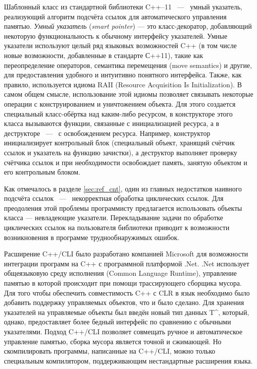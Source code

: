 Шаблонный класс  из стандартной библиотеки C++--11
~---~ умный указатель, реализующий алгоритм подсчёта ссылок для автоматического управления 
памятью. 
\emph{Умный указатель} (\emph{smart pointer}) --- это класс-декоратор, добавляющий некоторую 
функциональность к обычному интерфейсу указателей. Умные указатели используют целый ряд 
языковых возможностей C++ (в том числе новые возможности, добавленные в стандарте С++11), 
такие как переопределение операторов, семантика перемещения (move semantics) и другие, 
для предоставления удобного и интуитивно понятного интерфейса. 
Также, как правило, используется идиома RAII (Resource Acquisition Is Initialization). 
В самом общем смысле, использование этой идиомы позволяет связывать некоторые операции с 
конструированием и уничтожением объекта. 
Для этого создается специальный класс-обёртка над каким-либо ресурсом, в конструкторе этого 
класса вызываются функции, связанные с инициализацией ресурса, а в деструкторе ~---~ с 
освобождением ресурса. 
Например, конструктор  инициализирует контрольный блок (специальный 
объект, хранящий счётчик ссылок и указатель на функцию зачистки), а деструктор выполняет 
проверку счётчика ссылок и при необходимости освобождает память, занятую объектом и его 
контрольным блоком.

Как отмечалось в разделе \ref{sec:ref_cnt}, один из главных недостатков наивного подсчёта 
ссылок ~---~ некорректная обработка циклических ссылок. 
Для преодоления этой проблемы программисту предлагается использовать объекты класса 
 --- невладеющие указатели. 
Перекладывание задачи по обработке циклических ссылок на пользователя библиотеки приводит 
к возможности возникновения в программе труднообнаружимых ошибок.

Расширение C++/CLI было разработано компанией Microsoft для возможности интеграции программ 
на C++ с программной платформой .Net. .Net использует общеязыковую среду исполнения 
(Common Language Runtime), управление памятью в которой происходит при помощи трассирующего 
сборщика мусора. 
Для того чтобы обеспечить совместимость C++ с CLR в язык необходимо было добавить поддержку 
управляемых объектов, что и было сделано. 
Для хранения указателей на управляемые объекты был введён новый тип данных 
T\textasciicircum, который, однако, предоставляет более бедный интерфейс по сравнению с 
обычными указателями. 
Подход C++/CLI позволяет совмещать ручное и автоматическое управление памятью, сборка 
мусора является точной и сжимающей. Но скомпилировать программы, написанные на C++/CLI, 
можно только специальным компилятором, поддерживающим нестандартные расширения языка.

